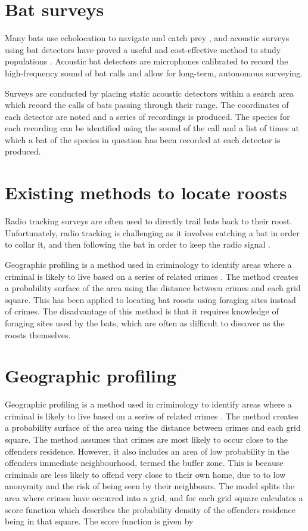 \section{Bat surveys}

Many bats use echolocation to navigate and catch prey
\cite{schnitzler2003}, and acoustic surveys using bat detectors have proved a
useful and cost-effective method to study populations \cite{Walters2012}.
Acoustic bat detectors are microphones calibrated to record the high-frequency
sound of bat calls and allow for long-term, autonomous surveying.

Surveys are conducted by placing static acoustic detectors within a search
area which record the calls of bats passing through their range. The coordinates
of each detector are noted and a series of recordings is produced. The species
for each recording can be identified using the sound of the call and a list of
times at which a bat of the species in question has been recorded at each
detector is produced.


\section{Existing methods to locate roosts}

Radio tracking surveys are often used to directly trail bats back to their
roost. Unfortunately, radio tracking is challenging as it involves catching a
bat in order to collar it, and then following the bat in order to keep the radio
signal \cite{Lewis1995}.

Geographic profiling is a method used in criminology to identify areas where a
criminal is likely to live based on a series of related crimes
\cite{Rossmo1999}. The method creates a probability surface of the area using
the distance between crimes and each grid square. This has been applied to
locating bat roosts \cite{Comber2006} using foraging sites instead of crimes.
The disadvantage of this method is that it requires knowledge of foraging sites
used by the bats, which are often as difficult to discover as the roosts themselves.


\section{Geographic profiling}
Geographic profiling is a method used in criminology to identify areas where a criminal is likely to live based on a series of related crimes
\cite{Rossmo1999}. The method creates a probability surface of the area using the distance between crimes and each grid square. The method assumes that crimes are most likely to occur close to the offenders residence. However, it also includes an area of low probability in the offenders immediate neighbourhood, termed the buffer zone. This is because criminals are less likely to offend very close to their own home, due to to low anonymity and the risk of being seen by their neighbours. The model splits the area where crimes have occurred into a grid, and for each grid square calculates a score function which describes the probability density of the offenders residence being in that square. The score function is given by


